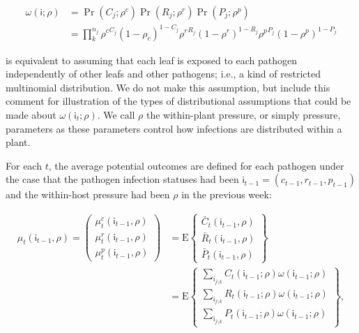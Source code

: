 \documentclass[]{article}
\begin{document}
\begin{align*}
\omega(\mathsf{i}; \rho) &= \Pr(C_{j}; \rho^c) \Pr(R_{j}; \rho^r) \Pr(P_{j}; \rho^p) \\
&= \prod_{k}^{n_{j}} {\rho^c}^{C_j} (1 - \rho_c)^{1 - C_j} {\rho^r}^{R_j} (1 - \rho^r)^{1 - R_j} {\rho^p}^{P_j} (1 - \rho^p)^{1 - P_j}
\end{align*}

is equivalent to assuming that each leaf is exposed to each pathogen
independently of other leafs and other pathogens; i.e., a kind of
restricted multinomial distribution. We do not make this assumption, but
include this comment for illustration of the types of distributional
assumptions that could be made about \(\omega(\mathsf{i}_{t}; \rho)\).
We call \(\rho\) the within-plant pressure, or simply pressure,
parameters as these parameters control how infections are distributed
within a plant.

For each \(t\), the average potential outcomes are defined for each
pathogen under the case that the pathogen infection statuses had been
\(\mathsf{i}_{t - 1} = (c_{t -1}, r_{t-1}, p_{t-1})\) and the
within-host pressure had been \(\rho\) in the previous week:

\begin{align*}
\mu_{t}(\mathsf{i}_{t-1}, \rho) = 
\begin{pmatrix}
  \mu^c_{t}(\mathsf{i}_{t-1}, \rho) \\
  \mu^r_{t}(\mathsf{i}_{t-1}, \rho) \\
  \mu^p_{t}(\mathsf{i}_{t-1}, \rho) 
\end{pmatrix} &= 
\mathrm{E} 
\left\{ 
\begin{array}{l}
  \bar{C}_{t}(\mathsf{i}_{t-1}, \rho) \\
  \bar{R}_{t}(\mathsf{i}_{t-1}, \rho) \\ 
  \bar{P}_{t}(\mathsf{i}_{t-1}, \rho) 
\end{array}
\right\} \\
&= 
\mathrm{E} \left\{
\begin{array}{l}
  \sum_{\mathsf{i}_{j \setminus k}} C_{t}(\mathsf{i}_{t-1}; \rho) \omega(\mathsf{i}_{t-1}; \rho)  \\
  \sum_{\mathsf{i}_{j \setminus k}} R_{t}(\mathsf{i}_{t-1}; \rho) \omega(\mathsf{i}_{t-1}; \rho)  \\ 
  \sum_{\mathsf{i}_{j \setminus k}} P_{t}(\mathsf{i}_{t-1}; \rho) \omega(\mathsf{i}_{t-1}; \rho) 
\end{array}
\right\}
,
\end{align*}
\end{document}
